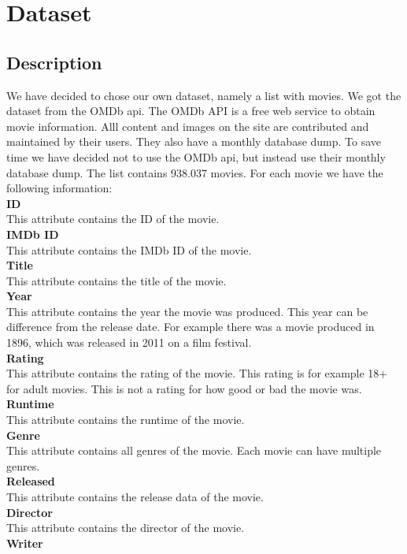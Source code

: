\section{Dataset}\label{Sec:Dat}
\subsection{Description}
We have decided to chose our own dataset, namely a list with movies. 
We got the dataset from the OMDb api. 
The OMDb API is a free web service to obtain movie information.
Alll content and images on the site are contributed and maintained by their users.
They also have a monthly database dump.
To save time we have decided not to use the OMDb api, but instead use their monthly database dump.
The list contains 938.037 movies.
For each movie we have the following information:\\
\textbf{ID} \\
This attribute contains the ID of the movie. \\
\textbf{IMDb ID} \\
This attribute contains the IMDb ID of the movie. \\
\textbf{Title} \\
This attribute contains the title of the movie. \\
\textbf{Year} \\
This attribute contains the year the movie was produced. 
This year can be difference from the release date.
For example there was a movie produced in 1896, which was released in 2011 on a film festival. \\
 \textbf{Rating} \\
This attribute contains the rating of the movie. 
This rating is for example 18+ for adult movies. 
This is not a rating for how good or bad the movie was.\\
 \textbf{Runtime} \\
This attribute contains the runtime of the movie.\\
 \textbf{Genre} \\
This attribute contains all genres of the movie. Each movie can have multiple genres.\\
 \textbf{Released} \\
This attribute contains the release data of the movie. \\
 \textbf{Director} \\
This attribute contains the director of the movie.\\
 \textbf{Writer} \\
